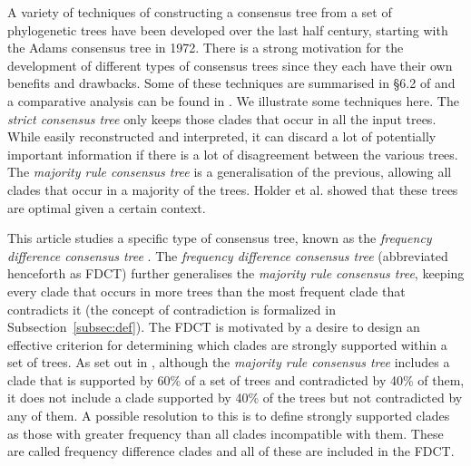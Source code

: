 \documentclass{article}
\begin{document}
    A variety of techniques of constructing a consensus tree from a set of phylogenetic trees have been developed over the last half century, starting with the Adams consensus tree \cite{adams1972consensus} in 1972. There is a strong motivation for the development of different types of consensus trees since they each have their own benefits and drawbacks. Some of these techniques are summarised in \S 6.2 of \cite{bryant1997hunting} and a comparative analysis can be found in \cite{bryant2003classification}. We illustrate some techniques here. The \textit{strict consensus tree} \cite{sokal1981taxonomic} only keeps those clades that occur in all the input trees. While easily reconstructed and interpreted, it can discard a lot of potentially important information if there is a lot of disagreement between the various trees. The \textit{majority rule consensus tree} \cite{margush1981consensusn} is a generalisation of the previous, allowing all clades that occur in a majority of the trees. Holder et al. \cite{holder2008justification} showed that these trees are optimal given a certain context.

    This article studies a specific type of consensus tree, known as the \textit{frequency difference consensus tree} \cite{goloboff2003improvements}. The \textit{frequency difference consensus tree} (abbreviated henceforth as FDCT) further generalises the \textit{majority rule consensus tree}, keeping every clade that occurs in more trees than the most frequent clade that contradicts it (the concept of contradiction is formalized in Subsection~\ref{subsec:def}). The FDCT is motivated by a desire to design an effective criterion for determining which clades are strongly supported within a set of trees. As set out in \cite{goloboff2003improvements}, although the \textit{majority rule consensus tree} includes a clade that is supported by 60\% of a set of trees and contradicted by 40\% of them, it does not include a clade supported by 40\% of the trees but not contradicted by any of them. A possible resolution to this is to define strongly supported clades as those with greater frequency than all clades incompatible with them. These are called frequency difference clades and all of these are included in the FDCT.
\end{document}
